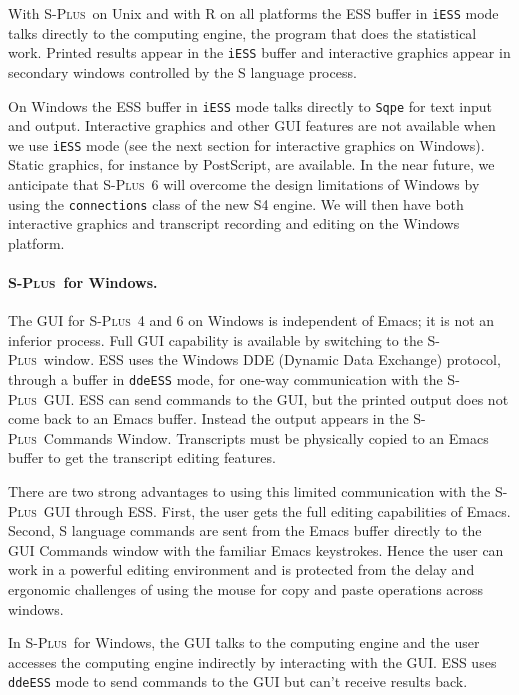\documentclass{article}
\newcommand*{\Splus}{\textsc{S-Plus}}
\newcommand{\stexttt}[1]{{\small\texttt{#1}}}
\begin{document}
With \Splus\ on Unix and with R on all platforms the ESS buffer in
\stexttt{iESS} mode talks directly to the computing engine, the
program that does the statistical work.  Printed results appear in the
\stexttt{iESS} buffer and interactive graphics appear in secondary
windows controlled by the S language process.

On Windows the ESS buffer in \stexttt{iESS} mode talks directly to
\stexttt{Sqpe} for text input and output.  Interactive graphics and
other GUI features are not available when we use \stexttt{iESS} mode
(see the next section for interactive graphics on Windows).
Static graphics, for instance by PostScript, are available.  In the
near future, we anticipate that \Splus\ 6 will overcome the design
limitations of Windows by using the \stexttt{connections} class of the
new S4 engine.  We will then have both interactive graphics and transcript
recording and editing on the Windows platform.



\paragraph{\Splus\ for Windows.}
The GUI for \Splus\ 4 and 6 on Windows is independent of Emacs; it is not
an inferior process.  Full GUI
capability is available by switching to the \Splus\ window.
ESS uses the Windows DDE (Dynamic Data Exchange) protocol,
through a buffer in \stexttt{ddeESS} mode, for one-way communication with
the \Splus\ GUI.
ESS can send commands to the GUI, but the printed
output does not come back to an Emacs buffer.  Instead the output appears in
the \Splus\ Commands Window.  Transcripts must be physically copied to
an Emacs buffer to get the transcript editing features.

There are two strong advantages to using this limited communication
with the \Splus\ GUI through ESS.  First, the user gets the full
editing capabilities of Emacs.  Second, S language commands are sent
from the Emacs buffer directly to the GUI Commands window with the
familiar Emacs keystrokes.  Hence the user can work in a powerful
editing environment and is protected from the delay and ergonomic
challenges of using the mouse for copy and paste operations across
windows.

In \Splus\ for Windows, the GUI
talks to the computing engine and the user accesses the computing
engine indirectly by interacting with the GUI.  ESS uses
\stexttt{ddeESS} mode to send commands to the GUI but can't receive
results back.
\end{document}
